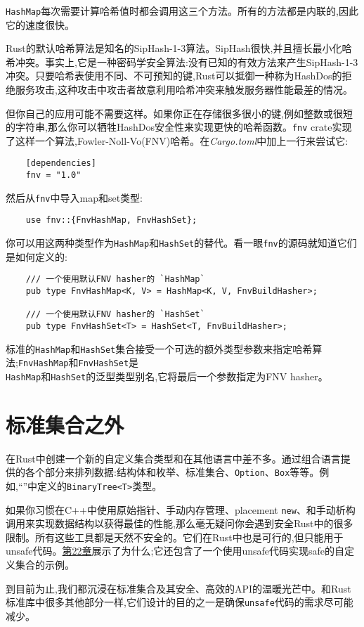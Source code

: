 \texttt{HashMap}每次需要计算哈希值时都会调用这三个方法。所有的方法都是内联的,因此它的速度很快。

Rust的默认哈希算法是知名的SipHash-1-3算法。SipHash很快,并且擅长最小化哈希冲突。事实上,它是一种密码学安全算法:没有已知的有效方法来产生SipHash-1-3冲突。只要哈希表使用不同、不可预知的键,Rust可以抵御一种称为HashDos的拒绝服务攻击,这种攻击中攻击者故意利用哈希冲突来触发服务器性能最差的情况。

但你自己的应用可能不需要这样。如果你正在存储很多很小的键,例如整数或很短的字符串,那么你可以牺牲HashDos安全性来实现更快的哈希函数。\texttt{fnv} crate实现了这样一个算法,Fowler-Noll-Vo(FNV)哈希。在\emph{Cargo.toml}中加上一行来尝试它:
\begin{verbatim}
    [dependencies]
    fnv = "1.0"
\end{verbatim}

然后从\texttt{fnv}中导入map和set类型:
\begin{verbatim}
    use fnv::{FnvHashMap, FnvHashSet};
\end{verbatim}

你可以用这两种类型作为\texttt{HashMap}和\texttt{HashSet}的替代。看一眼\texttt{fnv}的源码就知道它们是如何定义的:
\begin{verbatim}
    /// 一个使用默认FNV hasher的 `HashMap`
    pub type FnvHashMap<K, V> = HashMap<K, V, FnvBuildHasher>;

    /// 一个使用默认FNV hasher的 `HashSet`
    pub type FnvHashSet<T> = HashSet<T, FnvBuildHasher>;
\end{verbatim}

标准的\texttt{HashMap}和\texttt{HashSet}集合接受一个可选的额外类型参数来指定哈希算法;\texttt{FnvHashMap}和\texttt{FnvHashSet}是\\
\texttt{HashMap}和\texttt{HashSet}的泛型类型别名,它将最后一个参数指定为FNV hasher。

\section{标准集合之外}

在Rust中创建一个新的自定义集合类型和在其他语言中差不多。通过组合语言提供的各个部分来排列数据:结构体和枚举、标准集合、\texttt{Option}、\texttt{Box}等等。例如,“”中定义的\texttt{BinaryTree<T>}类型。

如果你习惯在C++中使用原始指针、手动内存管理、placement \texttt{new}、和手动析构调用来实现数据结构以获得最佳的性能,那么毫无疑问你会遇到安全Rust中的很多限制。所有这些工具都是天然不安全的。它们在Rust中也是可行的,但只能用于unsafe代码。\hyperref[ch22]{第22章}展示了为什么;它还包含了一个使用unsafe代码实现safe的自定义集合的示例。

到目前为止,我们都沉浸在标准集合及其安全、高效的API的温暖光芒中。和Rust标准库中很多其他部分一样,它们设计的目的之一是确保\texttt{unsafe}代码的需求尽可能减少。
